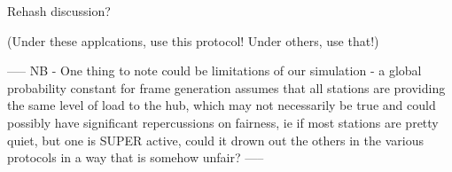 \documentclass[twocolumn]{article}
\begin{document}
Rehash discussion?

(Under these applcations, use this protocol! Under others, use that!)


-----
NB -
One thing to note could be limitations of our simulation - a global probability constant 
for frame generation assumes that all stations are providing the same level of load to 
the hub, which may not necessarily be true and could possibly have significant
repercussions on fairness, ie if most stations are pretty quiet, but one is SUPER active,
could it drown out the others in the various protocols in a way that is somehow unfair?
-----
\end{document}
